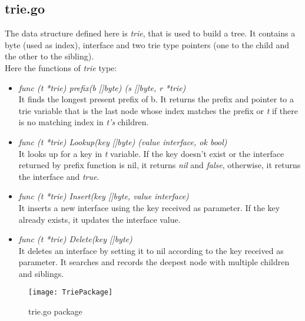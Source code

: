 \subsection{trie.go} 

The data structure defined here is \emph{trie}, that is used to build a tree. It contains a byte (used as index), interface and two trie type pointers (one to the child and the other to the sibling).\\
Here the functions of \emph{trie} type:

\begin{itemize}

\item \emph{func (t *trie) prefix(b []byte) (s []byte, r *trie)}\\
It finds the longest present prefix of b. It returns the prefix and pointer to a trie variable that is the last node whose index matches the prefix or \emph{t} if there is no matching index in \emph{t's} children.

\item \emph{func (t *trie) Lookup(key []byte) (value interface{}, ok bool)}\\
It looks up for a key in \emph{t} variable. If the key doesn't exist or the interface returned by prefix function is nil, it returns \emph{nil} and \emph{false}, otherwise, it returns the interface and \emph{true}.

\item \emph{func (t *trie) Insert(key []byte, value interface{})}\\
It inserts a new interface using the key received as parameter. If the key already exists, it updates the interface value.

\item \emph{func (t *trie) Delete(key []byte)}\\
It deletes an interface by setting it to nil according to the key received as parameter. It searches and records the deepest node with multiple children and siblings.

\end{itemize}

\begin{figure}[H]
\centering
\texttt{[image: TriePackage]}
\caption{trie.go package}
\end{figure}